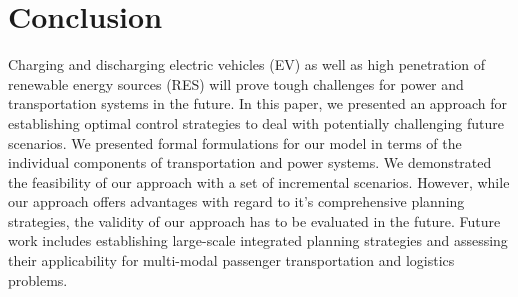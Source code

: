 \section{Conclusion}
\label{conclusion}



Charging and discharging electric vehicles (EV) as well as high penetration of renewable energy sources (RES) will prove tough challenges for power and transportation systems in the future. In this paper, we presented an approach for establishing optimal control strategies to deal with potentially challenging future scenarios. We presented formal formulations for our model in terms of the individual components of transportation and power systems. We demonstrated the feasibility of our approach with a set of incremental scenarios. However, while our approach offers advantages with regard to it's comprehensive planning strategies, the validity of our approach has to be evaluated in the future. Future work includes establishing large-scale integrated planning strategies and assessing their applicability for multi-modal passenger transportation and logistics problems.
